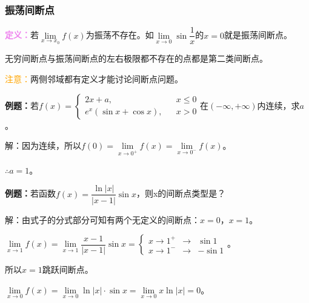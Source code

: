\documentclass[UTF8, 12pt]{ctexart}
\begin{document}
\subsubsection{振荡间断点}

\begin{minipage}{0.6\linewidth}
    \textcolor{violet}{\textbf{定义：}}若$\lim\limits_{x\to x_0}f(x)$为振荡不存在。如$\lim\limits_{x\to 0}\sin\dfrac{1}{x}$的$x=0$就是振荡间断点。
\end{minipage}
\hfill
\begin{minipage}{0.3\linewidth}
\end{minipage}

无穷间断点与振荡间断点的左右极限都不存在的点都是第二类间断点。

\textcolor{orange}{注意：}两侧邻域都有定义才能讨论间断点问题。\medskip

\textbf{例题：}若$f(x)=\left\{
    \begin{array}{lcl}
    2x+a, & & x\leqslant 0 \\
        e^x(\sin x+\cos x), & & x>0
    \end{array} \right.
$在$(-\infty,+\infty)$内连续，求$a$。

解：因为连续，所以$f(0)=\lim\limits_{x\to 0^+}f(x)=\lim\limits_{x\to 0^-}f(x)$。

$\therefore a=1$。

\textbf{例题：}若函数$f(x)=\dfrac{\ln\vert x\vert}{\vert x-1\vert}\sin x$，则x的间断点类型是？\medskip

解：由式子的分式部分可知有两个无定义的间断点：$x=0$，$x=1$。\medskip

$\lim\limits_{x\to 1}f(x)=\lim\limits_{x\to 1}\dfrac{x-1}{\vert x-1\vert}\sin x=\left\{
    \begin{array}{lcl}
        x\to 1^+ & \rightarrow & \sin 1 \\
        x\to 1^- & \rightarrow & -\sin 1
    \end{array} \right.
$。

所以$x=1$跳跃间断点。

$\lim\limits_{x\to 0}f(x)=\lim\limits_{x\to 0}\ln\vert x\vert\cdot\sin x=\lim\limits_{x\to 0}x\ln\vert x\vert=0$。
\end{document}
